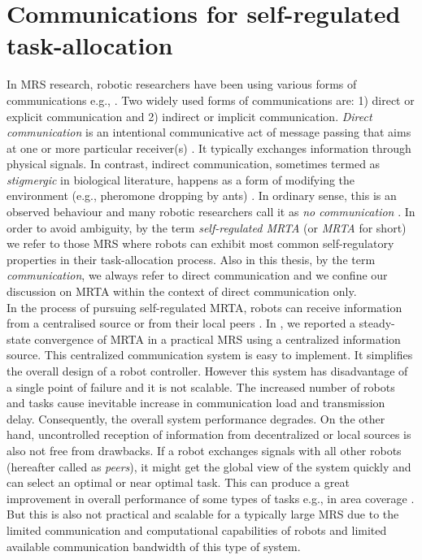 \section{Communications for self-regulated task-allocation}
In MRS research, robotic researchers have been using various forms of communications e.g., \cite{Bonabeau+1999,Labella2007}. Two widely used forms of communications are: 1) direct or explicit communication and 2) indirect or implicit communication. {\em Direct communication} is an intentional communicative act of message passing that aims at one or more particular receiver(s) \cite{Mataric1998}. It typically exchanges information through physical signals. In contrast, indirect communication, sometimes termed as {\em stigmergic} in biological literature, happens as a form of modifying the environment (e.g., pheromone dropping by ants) \cite{Bonabeau+1999}. In ordinary sense, this is an observed behaviour and many robotic researchers call it as {\em no communication} \cite{Labella2007}. In order to avoid ambiguity, by the term {\em self-regulated MRTA} (or {\em MRTA} for short) we refer to those MRS where robots can exhibit most common self-regulatory properties \cite{Bonabeau+1999} in their task-allocation process. Also in this thesis, by the term {\em communication}, we always refer to direct communication and we confine our discussion on MRTA within the context of direct communication only.\\
%
In the process of pursuing self-regulated MRTA, robots can receive information from a centralised source \cite{Krieger+2000} or from their local peers \cite{Agassounon+2004}. In \cite{Sarker+2010robotic}, we reported a steady-state convergence of MRTA in a practical MRS using a centralized information source. This centralized communication system is easy to implement. It simplifies the overall design of a robot controller. However this system has disadvantage of a single point of failure and it is not scalable. The increased number of robots and tasks cause inevitable increase in communication load and transmission delay. Consequently, the overall system performance degrades. On the other hand, uncontrolled reception of information from decentralized or local sources is also not free from drawbacks. If a robot exchanges signals with all other robots (hereafter called as {\em peers}), it might get the global view of the system quickly and can select an optimal or near optimal task. This can produce a great improvement in overall performance of some types of tasks e.g., in area coverage \cite{Rutishauser+2009}. But this is also not practical and scalable for a typically large MRS due to the limited communication and computational capabilities of robots and limited available communication bandwidth of this type of system.\\

